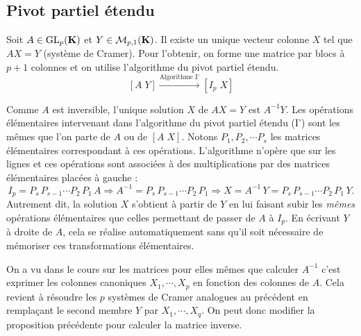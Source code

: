 \subsection{Pivot partiel étendu}
\begin{prop}
 Soit $A\in \text{GL}_p(\mathbf{K})$ et $Y\in \mathcal{M}_{p,1}(\mathbf{K})$. Il existe un unique vecteur colonne $X$ tel que $AX=Y$ (système de Cramer). Pour l'obtenir, on forme une matrice par blocs à $p+1$ colonnes et on utilise l'algorithme du pivot partiel étendu.
\begin{displaymath}
\left[ A \; Y\right] \xrightarrow{\text{Algorithme I'}} \left[ I_p\; X\right] 
\end{displaymath}
\end{prop}
\begin{demo}
 Comme $A$ est inversible, l'unique solution $X$ de $A X = Y$ est $A^{-1} Y$.\newline
 Les opérations élémentaires intervenant dans l'algorithme du pivot partiel étendu (I') sont les mêmes que l'on parte de $A$ ou de $[A\;X]$. Notons $P_1, P_2,\cdots P_s$ les matrices élémentaires correspondant à ces opérations. L'algorithme n'opère que sur les lignes et ces opérations sont associées à des multiplications par des matrices élémentaires placées à gauche :
\[
 I_p  = P_s\,P_{s-1}\cdots P_2\,P_1\,A \Rightarrow A^{-1} = P_s\,P_{s-1}\cdots P_2 \, P_1 
 \Rightarrow X = A^{-1}\,Y = P_s\,P_{s-1}\cdots P_2 \, P_1\, Y .
\]
Autrement dit, la solution $X$ s'obtient à partir de $Y$ en lui faisant subir les \emph{mêmes} opérations élémentaires que celles permettant de passer de $A$ à $I_p$. En écrivant $Y$ à droite de $A$, cela se réalise automatiquement sans qu'il soit nécessaire de mémoriser ces transformations élémentaires.
\end{demo}

\begin{rem}
 On a vu dans le cours sur les matrices pour elles mêmes que calculer $A^{-1}$ c'est exprimer les colonnes canoniques $X_1, \cdots, X_p$ en fonction des colonnes de $A$. Cela revient à résoudre les $p$ systèmes de Cramer analogues au précédent en remplaçant le second membre $Y$ par $X_1, \cdots, X_q$. On peut donc modifier la proposition précédente pour calculer la matrice inverse.
\end{rem}

